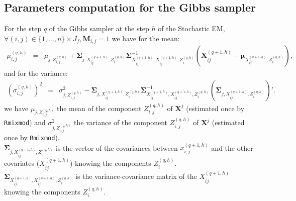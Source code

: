 \documentclass[12pt,a4paper]{report}
\begin{document}
%			
%			
			
\subsection{Parameters computation for the Gibbs sampler}	\label{gibbsparam}
					For the step $q$ of the Gibbs sampler at the step $h$ of the Stochastic EM, $\forall (i,j) \in \{1,\dots,n \}\times J_f,\boldsymbol{M}_{i,j}=1$
			we have for the mean:
			\begin{eqnarray}
			\mu_{i,j}^{(q,h)}&=&  \mu_{j,Z_{i,j}^{(q,h)}} + \boldsymbol{\Sigma}_{j,X_{\bar{ij}}^{(q+1,h)},Z_i^{(q,h)}}\boldsymbol{\Sigma}^{-1}_{X_{\bar{ij}}^{(q+1,h)},X_{\bar{ij}}^{(q+1,h)},Z_i^{(q,h)}}(\boldsymbol{X}_{i\bar{j}}^{(q+1,h)}-\boldsymbol{\mu}_{X_{i\bar{j}}^{(q+1,h)},Z_i^{(q,h)}}) , \nonumber 			\end{eqnarray}
			and for the variance:
\begin{eqnarray}
			(\sigma_{i,j}^{(q,h)})^2&=&\sigma_{j,Z_{i,j}^{(q,h)}}^2-\boldsymbol{\Sigma}_{j,X_{\bar{ij}}^{(q+1,h)},Z_i^{(q,h)}}\boldsymbol{\Sigma}^{-1}_{X_{\bar{ij}}^{(q+1,h)},X_{\bar{ij}}^{(q+1,h)},Z_i^{(q,h)}}(\boldsymbol{\Sigma}_{j,X_{\bar{ij}}^{(q+1,h)},Z_i^{(q,h)}})'. \nonumber 
			\end{eqnarray}
			we have  $\mu_{j,Z_{i,j}^{(q,h)}}$ the mean of the component $Z_{i,j}^{(q,h)}$ of $\boldsymbol{X}^j$ (estimated once by {\tt Rmixmod}) and
			$\sigma_{j,Z_{i,j}^{(q,h)}}^2$ the variance of the component $Z_{i,j}^{(q,h)}$ of $\boldsymbol{X}^j$ (estimated once by {\tt Rmixmod}).\\
			$\boldsymbol{\Sigma}_{j,X_{\bar{ij}}^{(q+1,h)},Z_i^{(q,h)}}$ is the vector of the covariances between $x_{i,j}^{(q+1,h)}$ and the other covariates ($X_{\bar{ij}}^{(q+1,h)}$) knowing the components $Z_i^{(q,h)}$.\\
			$\boldsymbol{\Sigma}_{X_{\bar{ij}}^{(q+1,h)},X_{\bar{ij}}^{(q+1,h)},Z_i^{(q,h)}}$ is the variance-covariance matrix of the $X_{\bar{ij}}^{(q+1,h)}$ knowing the components $Z_i^{(q,h)}$.
			
\end{document}
